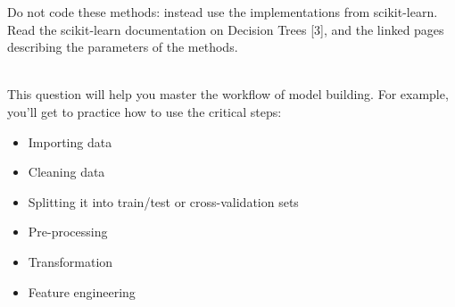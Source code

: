 \documentclass{article}
\newcommand*\fixindent{ \hspace{1pt}\\}
\begin{document}
Do not code these methods: instead use the implementations from scikit-learn. Read the scikit-learn documentation on Decision Trees [3], and the linked pages describing the parameters of the methods.\fixindent{}\fixindent{}

This question will help you master the workflow of model building. For example, you’ll get to practice how to use the critical steps:

\begin{itemize}
    \item {Importing data}
    \item {Cleaning data}
    \item {Splitting it into train/test or cross-validation sets}
    \item {Pre-processing}
    \item {Transformation}
    \item {Feature engineering}
\end{itemize}
\end{document}
